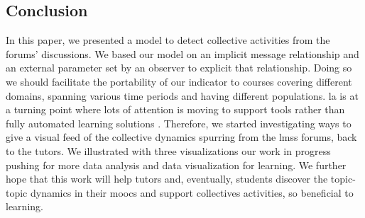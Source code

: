 \documentclass[a4paper,twoside]{article}
\begin{document}
\subsection{Conclusion}
In this paper, we presented a model to detect collective activities from the forums' discussions.  We based our model on an implicit message relationship and an external parameter set by an observer to explicit that relationship.  Doing so we should facilitate the portability of our indicator to courses covering different domains, spanning various time periods and having different populations.  %
\gls{la} is at a turning point where lots of attention is moving to support tools rather than fully automated learning solutions \citep{Kone2018,Baker2016}.
Therefore, we started investigating ways to give a visual feed of the collective dynamics spurring from the \glspl{lms} forums, back to the tutors.  We illustrated with three visualizations our work in progress pushing for more data analysis and data visualization for learning.  We further hope that this work will help tutors and, eventually, students discover the topic-topic dynamics in their \glspl{mooc} and support collectives activities, so beneficial to learning.

\vfill 



\small{}

\vfill
\end{document}
